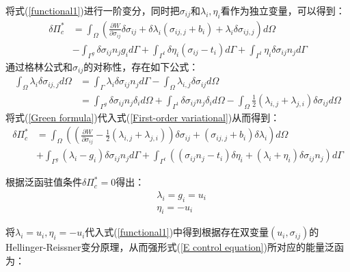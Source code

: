 将式(\ref{functional1})进行一阶变分，同时把$\sigma_{ij}$和$\lambda_i,\eta_i$看作为独立变量，可以得到：
\begin{equation}\label{First-order variational}
\begin{split}
    \delta\Pi_c^*&=\int_{\Omega}(\frac{\partial W}{\partial\sigma_{ij}}\delta\sigma_{ij}+\delta\lambda_i(\sigma_{ij,j}+b_i)+\lambda_i\delta\sigma_{ij,j})d\Omega\\
&-\int_{\Gamma^g}\delta\sigma_{ij}n_jg_id\Gamma+\int_{\Gamma^t}\delta\eta_i(\sigma_{ij}-t_i)d\Gamma+\int_{\Gamma^t}\eta_i\delta\sigma_{ij}n_jd\Gamma
\end{split}
\end{equation}
通过格林公式和$\sigma_{ij}$的对称性，存在如下公式：
\begin{equation}\label{Green formula}
\begin{split}
    \int_{\Omega}\lambda_i\delta\sigma_{ij,j}d\Omega&=\int_{\Gamma}\lambda_i\delta\sigma_{ij}n_jd\Gamma-\int_{\Omega}\lambda_{i,j}\delta\sigma_{ij}d\Omega\\
&=\int_{\Gamma^g}\delta\sigma_{ij}n_j\delta_id\Omega+\int_{\Gamma^t}\delta\sigma_{ij}n_j\delta_id\Omega-\int_{\Omega}\frac{1}{2}(\lambda_{i,j}+\lambda_{j,i})\delta\sigma_{ij}d\Omega
\end{split}
\end{equation}
将式(\ref{Green formula})代入式(\ref{First-order variational})从而得到：
\begin{equation}
\begin{split}
    \delta\Pi_c^*&=\int_{\Omega}((\frac{\partial W}{\partial\sigma_{ij}}-\frac{1}{2}(\lambda_{i,j}+\lambda_{j,i}))\delta\sigma_{ij}+(\sigma_{ij,j}+b_i)\delta\lambda_i)d\Omega\\
    &+\int_{\Gamma^g}(\lambda_i-g_i)\delta\sigma_{ij}n_jd\Gamma+\int_{\Gamma^t}((\sigma_{ij}n_j-t_i)\delta\eta_i+(\lambda_i+\eta_i)\delta\sigma_{ij}n_j)d\Gamma
\end{split}
\end{equation}\par
根据泛函驻值条件$\delta\Pi_c^*=0$得出：
\begin{equation}
\begin{split}
    &\lambda_i=g_i=u_i\\
    &\eta_i=-u_i
\end{split}
\end{equation}\par
将$\lambda_i=u_i,\eta_i=-u_i$代入式(\ref{functional1})中得到根据存在双变量$(u_i,\sigma_{ij})$的Hellinger-Reissner变分原理，从而强形式(\ref{E control equation})所对应的能量泛函为：
